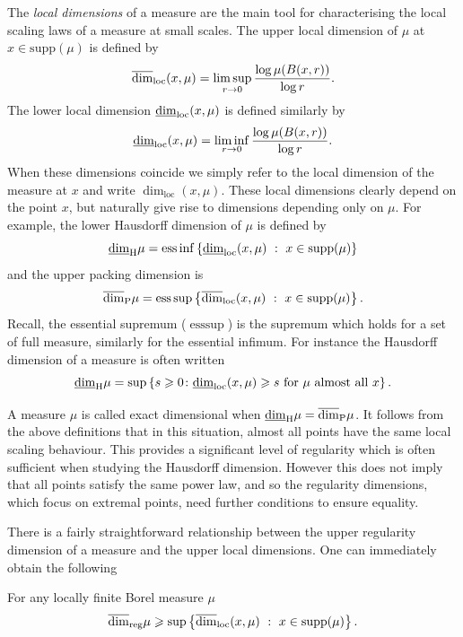 The \textit{local dimensions} of a measure are the main tool for characterising the local scaling laws of a measure at small scales. The upper local dimension of $\mu$ at $x \in \text{supp}(\mu)$ is defined by
\[
\ulocal=\limsup_{r\rightarrow 0} \frac{\log \mu(B(x,r))}{\log r}.
\]
The lower local dimension $\llocal$ is defined similarly by
\[
\llocal=\liminf_{r\rightarrow 0} \frac{\log \mu(B(x,r))}{\log r}.
\]
When these dimensions coincide we simply refer to the local dimension of the measure at $x$ and write $\dim_{\text{loc}}(x,\mu)$. These local dimensions clearly depend on the point $x$, but naturally give rise to dimensions depending only on $\mu$. For example, the lower Hausdorff dimension of $\mu$ is defined by
\[
\underline{\dim}_\H \mu=\text{ess}  \inf \left\{  \underline{\dim}_{\text{loc}}(x,\mu)  \ : \  x\in \text{supp}(\mu) \right\} 
\]
and the upper packing dimension is
\[
\overline{\dim}_\P \mu=\text{ess}  \sup \left\{ \overline{\dim}_{\text{loc}}(x,\mu) \ : \  x\in \text{supp}(\mu) \right\}.
\]
Recall, the essential supremum ($\text{ess} \sup$) is the supremum which holds for a set of full measure, similarly for the essential infimum. For instance the Hausdorff dimension of a measure is often written $$\underline{\dim}_\H \mu = \sup\left\{ s \ge 0 \colon \llocal \ge s  \text{ for $\mu$ almost all }x  \right\}.$$ 

A measure $\mu$ is called exact dimensional when $\underline{\dim}_\H \mu=\overline{\dim}_\P \mu$. It follows from the above definitions that in this situation, almost all points have the same local scaling behaviour. This provides a significant level of regularity which is often sufficient when studying the Hausdorff dimension. However this does not imply that all points satisfy the same power law, and so the regularity dimensions, which focus on extremal points, need further conditions to ensure equality.


There is a fairly straightforward relationship between the upper regularity dimension of a measure and the upper local dimensions. One can immediately obtain the following

\begin{lemma}
For any locally finite Borel measure $\mu$
\[
\r \geq \sup \left\{ \overline{\dim}_{\textup{loc}}(x,\mu) \ : \  x\in \textup{supp}(\mu) \right\}.
\]
\end{lemma} 

